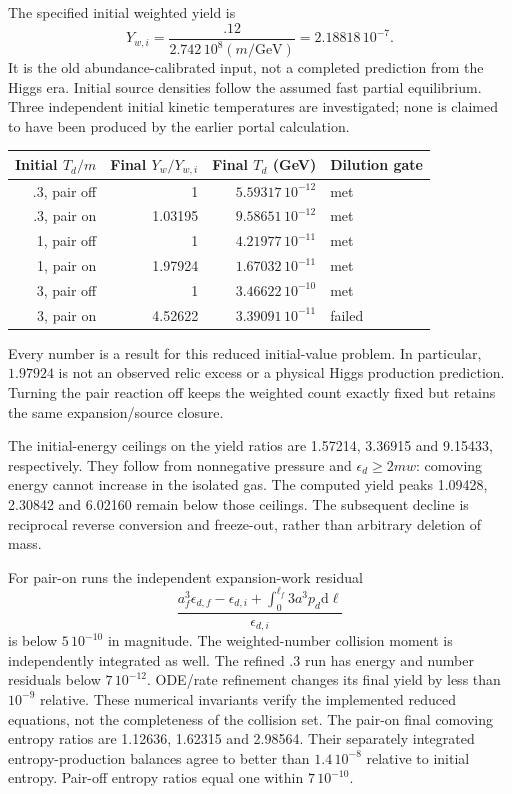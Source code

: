 \documentclass[11pt]{article}
\newcommand{\dd}{\mathrm d}
\begin{document}
The specified initial weighted yield is
\begin{equation}
 Y_{w,i}=\frac{.12}{2.742\,10^8(m/\mathrm{GeV})}
 =2.18818\,10^{-7}.
\end{equation}
It is the old abundance-calibrated input, not a completed prediction from
the Higgs era. Initial source densities follow the assumed fast partial
equilibrium. Three independent initial kinetic temperatures are investigated;
none is claimed to have been produced by the earlier portal calculation.

\begin{center}
\begin{tabular}{r r r l}
\toprule Initial $T_d/m$ & Final $Y_w/Y_{w,i}$ & Final $T_d$ (GeV) & Dilution gate\\\midrule
.3, pair off & 1 & $5.59317\,10^{-12}$ & met\\
.3, pair on & 1.03195 & $9.58651\,10^{-12}$ & met\\
1, pair off & 1 & $4.21977\,10^{-11}$ & met\\
1, pair on & 1.97924 & $1.67032\,10^{-11}$ & met\\
3, pair off & 1 & $3.46622\,10^{-10}$ & met\\
3, pair on & 4.52622 & $3.39091\,10^{-11}$ & failed\\\bottomrule
\end{tabular}
\end{center}
Every number is a result for this reduced initial-value problem. In
particular, $1.97924$ is not an observed relic excess or a physical Higgs
production prediction. Turning the pair reaction off keeps the weighted
count exactly fixed but retains the same expansion/source closure.

The initial-energy ceilings on the yield ratios are 1.57214, 3.36915 and
9.15433, respectively. They follow from nonnegative pressure and
$\epsilon_d\ge2mw$: comoving energy cannot increase in the isolated gas.
The computed yield peaks 1.09428, 2.30842 and 6.02160 remain below those
ceilings. The subsequent decline is reciprocal reverse conversion and
freeze-out, rather than arbitrary deletion of mass.

For pair-on runs the independent expansion-work residual
\begin{equation}
 \frac{a_f^3\epsilon_{d,f}-\epsilon_{d,i}
 +\int_0^{\ell_f}3a^3p_d\dd\ell}{\epsilon_{d,i}}
\end{equation}
is below $5\,10^{-10}$ in magnitude. The weighted-number collision moment
is independently integrated as well. The refined $.3$ run has energy and
number residuals below $7\,10^{-12}$. ODE/rate refinement changes its final
yield by less than $10^{-9}$ relative. These numerical invariants verify
the implemented reduced equations, not the completeness of the collision set.
The pair-on final comoving entropy ratios are 1.12636, 1.62315 and 2.98564.
Their separately integrated entropy-production balances agree to better
than $1.4\,10^{-8}$ relative to initial entropy. Pair-off entropy ratios
equal one within $7\,10^{-10}$.
\end{document}
